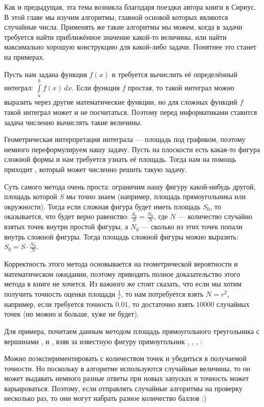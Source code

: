 Как и предыдущая, эта тема возникла благодаря поездки автора книги в Сириус. В этой главе мы изучим алгоритмы, главной основой которых являются случайные числа. Применять же такие алгоритмы мы можем, когда в задачи требуется найти приближённое значение какой-то величины, или найти максимально хорошую конструкцию для какой-либо задачи. Понятнее это станет на примерах.


Пусть нам задана функция $f(x)$ и требуется вычислить её определённый интеграл: $\int\limits_{a}^{b}f(x)\,dx$. Если функция $f$ простая, то такой интеграл можно выразить через другие математические функции, но для сложных функций $f$ такой интеграл может и не посчитаться. Поэтому перед информатиками ставится задача численно вычислять такие величины.

Геометрическая интерпретация интеграла — площадь под графиком, поэтому немного переформулируем нашу задачу. Пусть на плоскости есть какая-то фигура сложной формы и нам требуется узнать её площадь. Тогда нам на помощь приходит , который может численно решить такую задачу.

Суть самого метода очень проста: ограничим нашу фигуру какой-нибудь другой, площадь которой $S$ мы точно знаем (например, площадь прямоугольника или окружности). Тогда если сложная фигура будет иметь площадь $S_0$, то оказывается, что будет верно равенство: $\frac{S_0}{S} = \frac{N_0}{N}$, где $N$ — количество случайно взятых точек внутри простой фигуры, а $N_0$ — сколько из этих точек попали внутрь сложной фигуры. Тогда площадь сложной фигуры можно выразить: $S_0 = S \cdot \frac{N_0}{N}$.

Корректность этого метода основывается на геометрической вероятности и математическом ожидании, поэтому приводить полное доказательство этого метода в книге не хочется. Из важного же стоит сказать, что если мы хотим получить точность оценки площади $\frac{1}{r}$, то нам потребуется взять $N = r^2$, например, если требуется точность $0.01$, то достаточно взять $10000$ случайных точек (но можно и больше, хуже не будет).

Для примера, почитаем данным методом площадь прямоугольного треугольника с вершинами ,  и , взяв за известную фигуру прямоугольник , , , :

\nocode

Можно поэкспериментировать с количеством точек и убедиться в получаемой точности. Но поскольку в алгоритме используются случайные величины, то он может выдавать немного разные ответы при новых запусках и точность может варьироваться. Поэтому, если отправлять случайные алгоритмы на проверку несколько раз, то они могут набрать разное количество баллов :)


